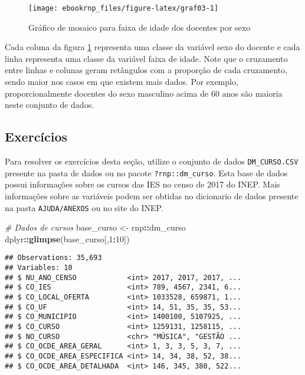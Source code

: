 \documentclass[11pt,]{style/krantz}
\makeatletter
\newenvironment{Shaded}{\begin{snugshade}}{\end{snugshade}}
\newcommand{\CommentTok}[1]{\textcolor[rgb]{0.56,0.35,0.01}{\textit{#1}}}
\newcommand{\DecValTok}[1]{\textcolor[rgb]{0.00,0.00,0.81}{#1}}
\newcommand{\KeywordTok}[1]{\textcolor[rgb]{0.13,0.29,0.53}{\textbf{#1}}}
\newcommand{\NormalTok}[1]{#1}
\newcommand{\OperatorTok}[1]{\textcolor[rgb]{0.81,0.36,0.00}{\textbf{#1}}}
\newcommand{\StringTok}[1]{\textcolor[rgb]{0.31,0.60,0.02}{#1}}
\newenvironment{kframe}{%
\medskip{}
\setlength{\fboxsep}{.8em}
 \def\at@end@of@kframe{}%
 \ifinner\ifhmode%
  \def\at@end@of@kframe{\end{minipage}}%
  \begin{minipage}{\columnwidth}%
 \fi\fi%
 \def\FrameCommand##1{\hskip\@totalleftmargin \hskip-\fboxsep
 \colorbox{shadecolor}{##1}\hskip-\fboxsep
     \hskip-\linewidth \hskip-\@totalleftmargin \hskip\columnwidth}%
 \MakeFramed {\advance\hsize-\width
   \@totalleftmargin\z@ \linewidth\hsize
   \@setminipage}}%
 {\par\unskip\endMakeFramed%
 \at@end@of@kframe}
\renewenvironment{Shaded}{\begin{kframe}}{\end{kframe}}
\theoremstyle{definition}
\theoremstyle{definition}
\theoremstyle{definition}
\theoremstyle{remark}
\makeatother
\begin{document}
\begin{figure}[H]

{\centering \texttt{[image: ebookrnp\_files/figure-latex/graf03-1]} 

}

\caption{Gráfico de mosaico para faixa de idade dos docentes por sexo}\label{fig:graf03}
\end{figure}

Cada coluna da figura \ref{fig:graf03} representa uma classe da variável sexo do docente e cada linha representa uma classe da variável faixa de idade. Note que o cruzamento entre linhas e colunas geram retângulos com a proporção de cada cruzamento, sendo maior nos casos em que existem mais dados. Por exemplo, proporcionalmente docentes do sexo masculino acima de 60 anos são maioria neste conjunto de dados.

\hypertarget{exercicios}{%
\subsection{Exercícios}\label{exercicios}}

Para resolver os exercícios desta seção, utilize o conjunto de dados \texttt{DM\_CURSO.CSV} presente na pasta de dados ou no pacote \texttt{?rnp::dm\_curso}. Esta base de dados possui informações sobre os cursos das IES no censo de 2017 do INEP. Mais informações sobre as variáveis podem ser obtidas no dicionario de dados presente na pasta \texttt{AJUDA/ANEXOS} ou no site do INEP.

\begin{Shaded}
\begin{Highlighting}[]
\CommentTok{# Dados de cursos}
\NormalTok{base_curso <-}\StringTok{ }\NormalTok{rnp}\OperatorTok{::}\NormalTok{dm_curso}
\NormalTok{dplyr}\OperatorTok{::}\KeywordTok{glimpse}\NormalTok{(base_curso[,}\DecValTok{1}\OperatorTok{:}\DecValTok{10}\NormalTok{])}
\end{Highlighting}
\end{Shaded}

\begin{verbatim}
## Observations: 35,693
## Variables: 10
## $ NU_ANO_CENSO            <int> 2017, 2017, 2017, ...
## $ CO_IES                  <int> 789, 4567, 2341, 6...
## $ CO_LOCAL_OFERTA         <int> 1033528, 659871, 1...
## $ CO_UF                   <int> 14, 51, 35, 35, 53...
## $ CO_MUNICIPIO            <int> 1400100, 5107925, ...
## $ CO_CURSO                <int> 1259131, 1258115, ...
## $ NO_CURSO                <chr> "MÚSICA", "GESTÃO ...
## $ CO_OCDE_AREA_GERAL      <int> 1, 3, 3, 5, 3, 7, ...
## $ CO_OCDE_AREA_ESPECIFICA <int> 14, 34, 38, 52, 38...
## $ CO_OCDE_AREA_DETALHADA  <int> 146, 345, 380, 522...
\end{verbatim}
\end{document}

